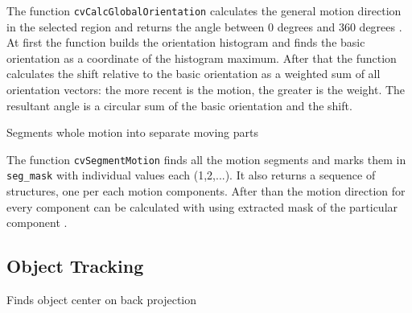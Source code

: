 The function \texttt{cvCalcGlobalOrientation} calculates the general
motion direction in the selected region and returns the angle between
0 degrees  and 360 degrees . At first the function builds the orientation histogram
and finds the basic orientation as a coordinate of the histogram
maximum. After that the function calculates the shift relative to the
basic orientation as a weighted sum of all orientation vectors: the more
recent is the motion, the greater is the weight. The resultant angle is
a circular sum of the basic orientation and the shift.

\label{SegmentMotion}

Segments whole motion into separate moving parts


\begin{description}
\end{description}

The function \texttt{cvSegmentMotion} finds all the motion segments and
marks them in \texttt{seg\_mask} with individual values each (1,2,...). It
also returns a sequence of 
structures, one per each motion components. After than the
motion direction for every component can be calculated with
 using extracted mask of the particular
component .

\subsection{Object Tracking}

\label{MeanShift}

Finds object center on back projection

